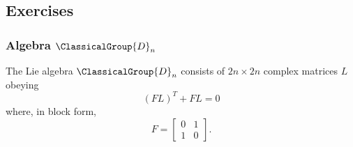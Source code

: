 \subsection{Exercises}
\subsubsection{Algebra \texorpdfstring{$\ClassicalGroup{D}_{n}$}{Dn}}

The Lie algebra $\ClassicalGroup{D}_{n}$ consists of $2n\times2n$ complex matrices
$L$ obeying
\begin{equation}
(FL)^{T}+FL=0
\end{equation}
where, in block form,
\begin{equation}
F=\begin{bmatrix}
0&1\\
1&0
\end{bmatrix}.
\end{equation}

